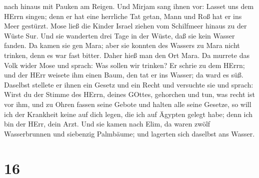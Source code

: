 nach hinaus mit Pauken am Reigen.  Und Mirjam sang ihnen
vor: Lasset uns dem HErrn singen; denn er hat eine herrliche Tat getan,
Mann und Roß hat er ins Meer gestürzt.  Mose ließ die
Kinder Israel ziehen vom Schilfmeer hinaus zu der Wüste Sur. Und sie
wanderten drei Tage in der Wüste, daß sie kein Wasser fanden.
 Da kamen sie gen Mara; aber sie konnten des Wassers zu
Mara nicht trinken, denn es war fast bitter. Daher hieß man den Ort
Mara.  Da murrete das Volk wider Mose und sprach: Was
sollen wir trinken?  Er schrie zu dem HErrn; und der HErr
weisete ihm einen Baum, den tat er ins Wasser; da ward es süß. Daselbst
stellete er ihnen ein Gesetz und ein Recht und versuchte sie
 und sprach: Wirst du der Stimme des HErrn, deines GOttes,
gehorchen und tun, was recht ist vor ihm, und zu Ohren fassen seine
Gebote und halten alle seine Gesetze, so will ich der Krankheit keine
auf dich legen, die ich auf Ägypten gelegt habe; denn ich bin der HErr,
dein Arzt.  Und sie kamen nach Elim, da waren zwölf
Wasserbrunnen und siebenzig Palmbäume; und lagerten sich daselbst ans
Wasser.

\hypertarget{section-15}{%
\section{16}\label{section-15}}

